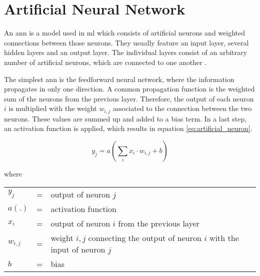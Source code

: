 \section{Artificial Neural Network}
\label{sec:theoretical_background:ann}

An \acrlong{ann} is a model used in \acrshort{ml} which consists of artificial neurons and weighted connections between those neurons.
They usually feature an input layer, several hidden layers and an output layer.
The individual layers consist of an arbitrary number of artificial neurons, which are connected to one another \cite[p.~33-36]{nn}.

The simplest \acrshort{ann} is the feedforward neural network, where the information propagates in only one direction.
A common propagation function is the weighted sum of the neurons from the previous layer.
Therefore, the output of each neuron $i$ is multiplied with the weight $w_{i, j}$ associated to the connection between the two neurons.
These values are summed up and added to a bias term.
In a last step, an activation function is applied, which results in equation \ref{eq:artificial_neuron}.

\begin{equation}
  y_j = a\left(\sum\limits_{i} x_i \cdot w_{i, j} + b\right)
  \label{eq:artificial_neuron}
\end{equation}

where

\begin{tabular}{lll}
  $y_j$ & = & output of neuron $j$ \\
  $a(.)$ & = & activation function \\
  $x_i$ & = & output of neuron $i$ from the previous layer \\
  $w_{i, j}$ & = & weight $i, j$ connecting the output of neuron $i$ with the input of neuron $j$ \\
  $b$ & = & bias \\
\end{tabular}
\\




